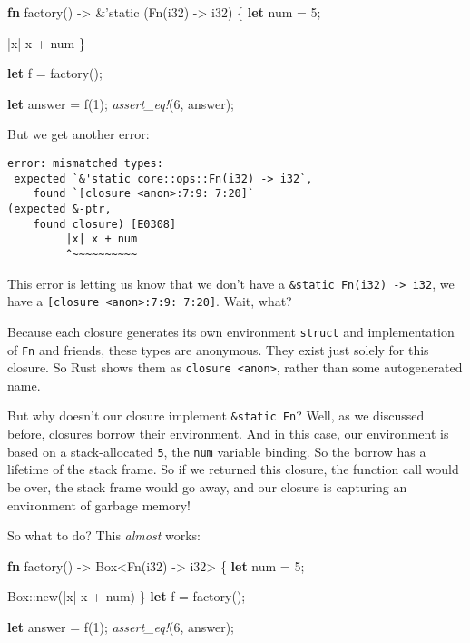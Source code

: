 \documentclass[a4paper,]{book}
\newenvironment{Shaded}{\begin{snugshade}}{\end{snugshade}}
\newcommand{\KeywordTok}[1]{\textcolor[rgb]{0.13,0.29,0.53}{\textbf{{#1}}}}
\newcommand{\DataTypeTok}[1]{\textcolor[rgb]{0.13,0.29,0.53}{{#1}}}
\newcommand{\DecValTok}[1]{\textcolor[rgb]{0.00,0.00,0.81}{{#1}}}
\newcommand{\OtherTok}[1]{\textcolor[rgb]{0.56,0.35,0.01}{{#1}}}
\newcommand{\BuiltInTok}[1]{{#1}}
\newcommand{\PreprocessorTok}[1]{\textcolor[rgb]{0.56,0.35,0.01}{\textit{{#1}}}}
\newcommand{\NormalTok}[1]{{#1}}
\begin{document}
\begin{Shaded}
\begin{Highlighting}[]
\KeywordTok{fn} \NormalTok{factory() -> &}\OtherTok{'static} \NormalTok{(}\BuiltInTok{Fn}\NormalTok{(}\DataTypeTok{i32}\NormalTok{) -> }\DataTypeTok{i32}\NormalTok{) \{}
    \KeywordTok{let} \NormalTok{num = }\DecValTok{5}\NormalTok{;}

    \NormalTok{|x| x + num}
\NormalTok{\}}

\KeywordTok{let} \NormalTok{f = factory();}

\KeywordTok{let} \NormalTok{answer = f(}\DecValTok{1}\NormalTok{);}
\PreprocessorTok{assert_eq!}\NormalTok{(}\DecValTok{6}\NormalTok{, answer);}
\end{Highlighting}
\end{Shaded}

But we get another error:

\begin{verbatim}
error: mismatched types:
 expected `&'static core::ops::Fn(i32) -> i32`,
    found `[closure <anon>:7:9: 7:20]`
(expected &-ptr,
    found closure) [E0308]
         |x| x + num
         ^~~~~~~~~~~
\end{verbatim}

This error is letting us know that we don't have a
\texttt{\&\textquotesingle{}static\ Fn(i32)\ -\textgreater{}\ i32}, we
have a \texttt{{[}closure\ \textless{}anon\textgreater{}:7:9:\ 7:20{]}}.
Wait, what?

Because each closure generates its own environment \texttt{struct} and
implementation of \texttt{Fn} and friends, these types are anonymous.
They exist just solely for this closure. So Rust shows them as
\texttt{closure\ \textless{}anon\textgreater{}}, rather than some
autogenerated name.

But why doesn't our closure implement
\texttt{\&\textquotesingle{}static\ Fn}? Well, as we discussed before,
closures borrow their environment. And in this case, our environment is
based on a stack-allocated \texttt{5}, the \texttt{num} variable
binding. So the borrow has a lifetime of the stack frame. So if we
returned this closure, the function call would be over, the stack frame
would go away, and our closure is capturing an environment of garbage
memory!

So what to do? This \emph{almost} works:

\begin{Shaded}
\begin{Highlighting}[]
\KeywordTok{fn} \NormalTok{factory() -> }\DataTypeTok{Box}\NormalTok{<}\BuiltInTok{Fn}\NormalTok{(}\DataTypeTok{i32}\NormalTok{) -> }\DataTypeTok{i32}\NormalTok{> \{}
    \KeywordTok{let} \NormalTok{num = }\DecValTok{5}\NormalTok{;}

    \DataTypeTok{Box}\NormalTok{::new(|x| x + num)}
\NormalTok{\}}
\KeywordTok{let} \NormalTok{f = factory();}

\KeywordTok{let} \NormalTok{answer = f(}\DecValTok{1}\NormalTok{);}
\PreprocessorTok{assert_eq!}\NormalTok{(}\DecValTok{6}\NormalTok{, answer);}
\end{Highlighting}
\end{Shaded}
\end{document}
